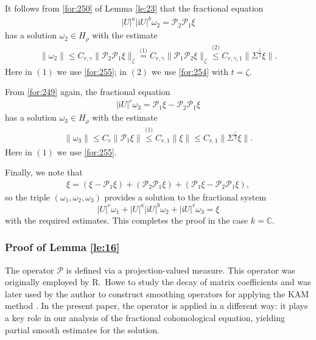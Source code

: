 \documentclass[11 pt]{amsart}
\newcommand{\CC}{\mathbb{C}}
\newcommand{\norm}[1]{\lVert#1\rVert}
\theoremstyle{definition}
\numberwithin{equation}{section}
\begin{document}
It follows from \eqref{for:250} of Lemma \ref{le:23} that  the fractional equation
\begin{align}\label{for:272}
    |U|^{a}|\textrm{i} U|^{b}\omega_{2}=\mathcal{P}_2\mathcal{P}_1\xi
  \end{align}
  has a solution $\omega_{2}\in H_\rho$ with the estimate
  \begin{align*}
 \norm{\omega_{2}}\leq C_{r,\gamma}\big\|\mathcal{P}_2\mathcal{P}_1\xi\big\|_{\zeta}\overset{\text{(1)}}{=} C_{r,\gamma}\big\|\mathcal{P}_1\mathcal{P}_2\xi\big\|_{\zeta}\overset{\text{(2)}}{\leq} C_{r,\gamma,1}\big\|\Sigma^{\frac{\zeta}{2}}\xi\big\|.
\end{align*}
Here in $(1)$ we use \eqref{for:255}; in $(2)$ we use \eqref{for:254} with $t=\zeta$.

From \eqref{for:249} again, the fractional equation
\begin{align}\label{for:274}
    |\textrm{i}U|^r\omega_3=\mathcal{P}_1\xi-\mathcal{P}_2\mathcal{P}_1\xi
  \end{align}
  has a solution $\omega_3\in H_\rho$ with the estimate
  \begin{align*}
 \norm{\omega_3}\leq C_{r}\norm{\mathcal{P}_1\xi}\overset{\text{(1)}}{\leq}C_{r,1}\norm{\xi}\leq C_{r,1}\big\|\Sigma^{\frac{\zeta}{2}}\xi\big\|.
\end{align*}
Here in $(1)$ we use \eqref{for:255}.

Finally, we note that
\begin{align}\label{for:265}
\xi=( \xi-\mathcal{P}_1\xi)+(\mathcal{P}_2\mathcal{P}_1\xi)+(\mathcal{P}_1\xi-\mathcal{P}_2\mathcal{P}_1\xi),
\end{align}
so the triple $(\omega_1,\omega_2,\omega_3)$ provides a solution to the
fractional system
\[
  |U|^r\omega_1 + |U|^{a}|\mathrm{i} U|^{b}\omega_{2}
  + |\mathrm{i}U|^r\omega_3 = \xi
\]
with the required estimates. This completes the proof in the case $k=\CC$.
\subsubsection{Proof of Lemma \ref{le:16}}\label{sec:41}

The operator $\mathcal{P}$ is defined via a projection-valued measure. This operator was originally employed by R.~Howe to study the decay of matrix coefficients and was later used by the author to construct smoothing operators for applying the KAM method \cite{W5}. In the present paper, the operator is applied in a different
way: it plays a key role in our analysis of the fractional cohomological equation, yielding partial smooth estimates for the solution.
\end{document}
